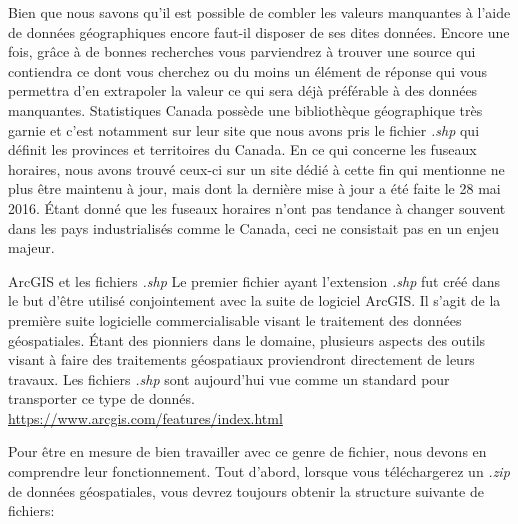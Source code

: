 Bien que nous savons qu'il est possible de combler les valeurs manquantes à l'aide de données géographiques encore faut-il disposer de ses dites données. Encore une fois, grâce à de bonnes recherches vous parviendrez à trouver une source qui contiendra ce dont vous cherchez ou du moins un élément de réponse qui vous permettra d'en extrapoler la valeur ce qui sera déjà préférable à des données manquantes. Statistiques Canada possède une bibliothèque géographique très garnie et c'est notamment sur leur site que nous avons pris le fichier \emph{.shp} qui définit les provinces et territoires du Canada. \cite{Data:BoundaryFiles} En ce qui concerne les fuseaux horaires, nous avons trouvé ceux-ci sur un site dédié à cette fin qui mentionne ne plus être maintenu à jour, mais dont la dernière mise à jour a été faite le 28 mai 2016. Étant donné que les fuseaux horaires n'ont pas tendance à changer souvent dans les pays industrialisés comme le Canada, ceci ne consistait pas en un enjeu majeur. \cite{Data:tzWorlwide} \\

\begin{moreInfo}{ArcGIS et les fichiers \emph{.shp}}
	Le premier fichier ayant l'extension \emph{.shp} fut créé dans le but d'être utilisé conjointement avec la suite de logiciel ArcGIS. Il s'agit de la première suite logicielle commercialisable visant le traitement des données géospatiales. Étant des pionniers dans le domaine, plusieurs aspects des outils visant à faire des traitements géospatiaux proviendront directement de leurs travaux. Les fichiers \emph{.shp} sont aujourd'hui vue comme un standard pour transporter ce type de donnés. \\
\url{https://www.arcgis.com/features/index.html}
\end{moreInfo}

Pour être en mesure de bien travailler avec ce genre de fichier, nous devons en comprendre leur fonctionnement. Tout d'abord, lorsque vous téléchargerez un \emph{.zip} de données géospatiales, vous devrez toujours obtenir la structure suivante de fichiers: \\



